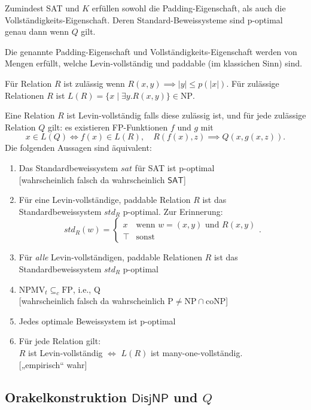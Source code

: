 \documentclass[nofonts]{uebung}
\def\hDisjNP{\ensuremath{\mathsf{DisjNP}}}
\begin{document}
\noindent
Zumindest SAT und $K$ erfüllen sowohl die Padding-Eigenschaft, als auch die Vollständigkeits-Eigenschaft.
Deren Standard-Beweissysteme sind p-optimal genau dann wenn $Q$ gilt.

Die genannte Padding-Eigenschaft und Vollständigkeits-Eigenschaft werden von Mengen erfüllt, welche Levin-vollständig und paddable (im klassichen Sinn) sind.
\clearpage

Für Relation $R$ ist zulässig wenn $R(x,y)\implies |y|\leq p(|x|)$. Für zulässige Relationen $R$ ist $L(R)=\{x\mid\exists y. R(x,y)\}\in\mathrm{NP}$.

Eine Relation $R$ ist Levin-vollständig falls diese zulässig ist,
und für jede zulässige Relation $Q$ gilt: es existieren FP-Funktionen $f$ und $g$ mit
\[ x\in L(Q) \iff f(x)\in L(R), \quad R(f(x),z) \implies Q(x, g(x,z)). \]
Die folgenden Aussagen sind äquivalent:
\begin{enumerate}
    \item Das Standardbeweissystem $sat$ für SAT ist p-optimal\\
        {}[wahrscheinlich falsch da wahrscheinlich $\mathsf{SAT}$]
    \item Für eine Levin-vollständige, paddable Relation $R$ ist das Standardbeweissystem $std_R$ p-optimal. Zur Erinnerung:
        \[ \mathit{std}_R(w) = \begin{cases} x & \text{wenn $w=(x,y)$ und $R(x,y)$}\\
        \top & \text{sonst}\end{cases}. \] 
    \item Für \emph{alle} Levin-vollständigen, paddable Relationen $R$ ist das Standardbeweissystem $std_R$ p-optimal
    \item $\mathrm{NPMV}_t\subseteq_c \mathrm{FP}$, i.e., Q\\
        {}[wahrscheinlich falsch da wahrscheinlich $\mathrm{P}\neq\mathrm{NP}\cap\mathrm{coNP}$]
    \item Jedes optimale Beweissystem ist p-optimal
    \item Für jede Relation gilt:\\ $R$ ist Levin-vollständig $\iff$ $L(R)$ ist many-one-vollständig.\\
        {}[„empirisch“ wahr]
\end{enumerate}
\clearpage


\subsection*{Orakelkonstruktion $\hDisjNP$ und $Q$}
\end{document}
